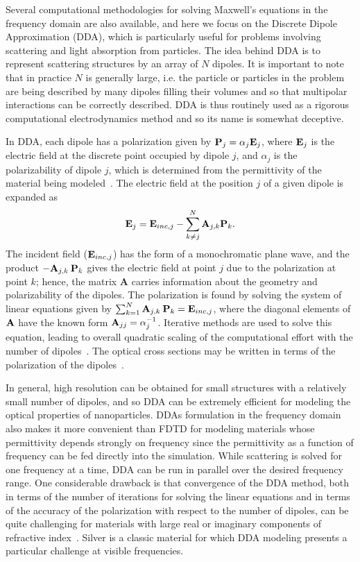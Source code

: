 \documentclass[10pt,letterpaper]{article}
\begin{document}
Several computational methodologies for solving Maxwell's equations in the frequency domain are also available, and here we focus on the Discrete
Dipole Approximation (DDA), which is particularly useful for problems involving scattering and light absorption from
particles.  The idea behind DDA is to represent scattering structures by an array of $N$ dipoles.  
It is important to note that in practice $N$ is generally large, i.e. the particle or particles
in the problem are being described by many dipoles filling their volumes 
and so that multipolar
interactions can be correctly described.  DDA is thus routinely used as a rigorous 
computational electrodynamics
method and so its name is somewhat deceptive.

In DDA, each dipole has a polarization given by 
${\bf P}_j = \alpha_j {\bf E}_j$, where ${\bf E}_j$ is the electric field 
at the discrete point occupied by dipole $j$, and $\alpha_j$ is the polarizability of dipole $j$, which 
is determined from the permittivity of the material being modeled~\cite{DF_JOptSocA_1994}.  The electric field at the position $j$ of a given dipole is expanded as
\begin{equation}
{\bf E}_j = {\bf E}_{inc,j} - \sum_{k \neq j}^N {\bf A}_{j,k} {\bf P}_k.
\end{equation}
The incident field (${\bf E}_{inc,j}$) has the form of a monochromatic plane wave, and the product
$-{\bf A}_{j,k} \: {\bf P}_k$ gives the electric field at point $j$ due to the polarization at point $k$; hence, the matrix {\bf A} carries information about
the geometry and polarizability of the dipoles.   
The polarization is found by solving the system of linear equations given by
$\sum_{k=1}^N {\bf A}_{j,k} \: {\bf P}_k = {\bf E}_{inc,j}$, where the diagonal elements of ${\bf A}$ have the known form
${\bf A}_{jj} = \alpha_j^{-1}$.
Iterative methods are used to solve this equation,
leading to overall quadratic scaling of
the computational effort with the number of dipoles~\cite{DF_JOptSocA_1994}. 
The optical cross
sections may be written 
in terms of the polarization of the dipoles~\cite{DF_JOptSocA_1994}.

In general, high resolution can be obtained for small structures with a relatively small number of
dipoles, and so DDA can be extremely efficient for modeling the optical properties of nanoparticles.  DDAs formulation in the frequency domain also
makes it more convenient than FDTD for modeling materials whose permittivity depends strongly on frequency since the permittivity as a function of
frequency can be fed directly into the simulation.  While scattering is solved for one frequency at a time, DDA can be run in parallel over the
desired frequency range.  One considerable drawback is that convergence of the DDA method, both in terms of the number of iterations for
solving the linear equations and in terms of the accuracy of the polarization with respect to the number of dipoles, can be quite
challenging for materials with large real or imaginary components of refractive index~\cite{YMH_PRE_2010}.  Silver is a classic material for which DDA modeling presents a particular challenge at visible frequencies.
\end{document}
